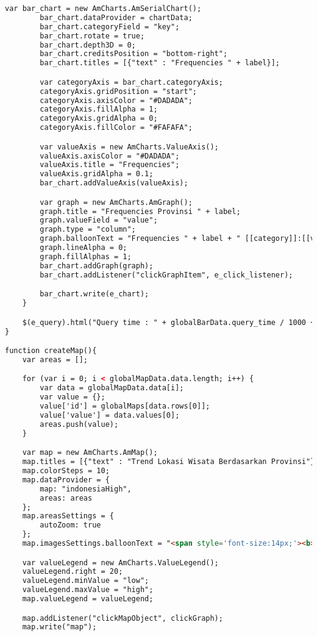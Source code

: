 \begin{lstlisting}[language=HTML,basicstyle=\tiny,caption=script-dashboard.js]
        var bar_chart = new AmCharts.AmSerialChart();
        bar_chart.dataProvider = chartData;
        bar_chart.categoryField = "key";
        bar_chart.rotate = true;
        bar_chart.depth3D = 0;
        bar_chart.creditsPosition = "bottom-right";
        bar_chart.titles = [{"text" : "Frequencies " + label}];

        var categoryAxis = bar_chart.categoryAxis;
        categoryAxis.gridPosition = "start";
        categoryAxis.axisColor = "#DADADA";
        categoryAxis.fillAlpha = 1;
        categoryAxis.gridAlpha = 0;
        categoryAxis.fillColor = "#FAFAFA";

        var valueAxis = new AmCharts.ValueAxis();
        valueAxis.axisColor = "#DADADA";
        valueAxis.title = "Frequencies";
        valueAxis.gridAlpha = 0.1;
        bar_chart.addValueAxis(valueAxis);

        var graph = new AmCharts.AmGraph();
        graph.title = "Frequencies Provinsi " + label;
        graph.valueField = "value";
        graph.type = "column";
        graph.balloonText = "Frequencies " + label + " [[category]]:[[value]]";
        graph.lineAlpha = 0;
        graph.fillAlphas = 1;
        bar_chart.addGraph(graph);
        bar_chart.addListener("clickGraphItem", e_click_listener);

        bar_chart.write(e_chart);
    }

    $(e_query).html("Query time : " + globalBarData.query_time / 1000 + "s");
}

function createMap(){
    var areas = [];

    for (var i = 0; i < globalMapData.data.length; i++) {
        var data = globalMapData.data[i];
        var value = {};
        value['id'] = globalMaps[data.rows[0]];
        value['value'] = data.values[0];
        areas.push(value);
    }

    var map = new AmCharts.AmMap();
    map.titles = [{"text" : "Trend Lokasi Wisata Berdasarkan Provinsi"}]
    map.colorSteps = 10;
    map.dataProvider = {
        map: "indonesiaHigh",
        areas: areas
    };
    map.areasSettings = {
        autoZoom: true
    };
    map.imagesSettings.balloonText = "<span style='font-size:14px;'><b>[[title]]</b>: [[value]]</span>";

    var valueLegend = new AmCharts.ValueLegend();
    valueLegend.right = 20;
    valueLegend.minValue = "low";
    valueLegend.maxValue = "high";
    map.valueLegend = valueLegend;

    map.addListener("clickMapObject", clickGraph);
    map.write("map");


\end{lstlisting}
